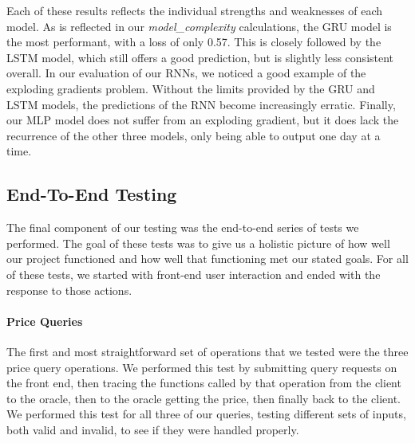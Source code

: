 \documentclass{ledger}
\begin{document}
Each of these results reflects the individual strengths and weaknesses of each model.  As is reflected in our
\textit{model\_complexity} calculations, the GRU model is the most performant, with a loss of only 0.57.  This is closely
followed by the LSTM model, which still offers a good prediction, but is slightly less consistent overall. In our
evaluation of our RNNs, we noticed a good example of the exploding gradients problem.  Without the limits provided by
the GRU and LSTM models, the predictions of the RNN become increasingly erratic.  Finally, our MLP model does not suffer
from an exploding gradient, but it does lack the recurrence of the other three models, only being able to output one day
at a time.

\subsection{End-To-End Testing}

The final component of our testing was the end-to-end series of tests we performed.  The goal of these tests was to give
us a holistic picture of how well our project functioned and how well that functioning met our stated goals.
For all of these tests, we started with front-end user interaction and ended with the response to those actions.

\paragraph{Price Queries}
The first and most straightforward set of operations that we tested were the three price query operations.
We performed this test by submitting query requests on the front end, then tracing the functions called by that operation
from the client to the oracle, then to the oracle getting the price, then finally back to the client.  We performed this
test for all three of our queries, testing different sets of inputs, both valid and invalid, to see if they were handled
properly.
\end{document}
